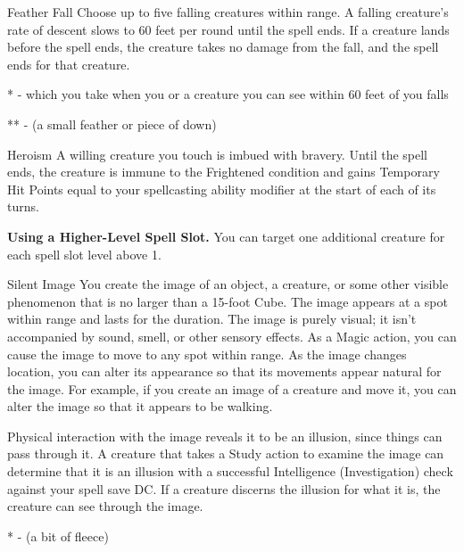 \begin{Spell}[
    level=1st,
    time=1 Reaction*,
    range=60 ft.,
    components={V, M**},
    duration=1 Minute,
    school=Transmutation,
    attack=None,
    effect=Exploration
]{Feather Fall}
Choose up to five falling creatures within range. A falling creature's rate of descent slows to 60 feet per round until the spell ends. If a creature lands before the spell ends, the creature takes no damage from the fall, and the spell ends for that creature.

* - which you take when you or a creature you can see within 60 feet of you falls

** - (a small feather or piece of down)
\end{Spell}


\begin{Spell}[
    level=1st,
    time=1 Action,
    range=Touch,
    components={V, S},
    duration=Concentration 1 Minute,
    school=Enchantment,
    attack=None,
    effect=Frightened
]{Heroism}
A willing creature you touch is imbued with bravery. Until the spell ends, the creature is immune to the Frightened condition and gains Temporary Hit Points equal to your spellcasting ability modifier at the start of each of its turns.

\textbf{Using a Higher-Level Spell Slot.} You can target one additional creature for each spell slot level above 1.
\end{Spell}


\begin{Spell}[
    tags=Concentration,
    level=1st,
    time=1 Action,
    range=60 ft. (15 ft. cube),
    components={V, S, M*},
    duration=10 Minutes,
    school=Illusion,
    attack=None,
    effect=Control
]{Silent Image}
You create the image of an object, a creature, or some other visible phenomenon that is no larger than a 15-foot Cube. The image appears at a spot within range and lasts for the duration. The image is purely visual; it isn't accompanied by sound, smell, or other sensory effects. As a Magic action, you can cause the image to move to any spot within range. As the image changes location, you can alter its appearance so that its movements appear natural for the image. For example, if you create an image of a creature and move it, you can alter the image so that it appears to be walking.

Physical interaction with the image reveals it to be an illusion, since things can pass through it. A creature that takes a Study action to examine the image can determine that it is an illusion with a successful Intelligence (Investigation) check against your spell save DC. If a creature discerns the illusion for what it is, the creature can see through the image.

* - (a bit of fleece)
\end{Spell}


